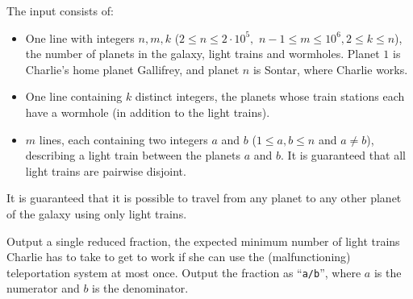 \begin{Input}
    The input consists of:
    \begin{itemize}
		\item One line with integers $n, m, k$ ($2 \leq n \leq 2\cdot10^5,$ $n - 1 \leq m \leq 10^6, 2\leq k\leq n$), the number of planets in the galaxy, light trains and
			wormholes.
			Planet $1$ is Charlie's home planet Gallifrey, and planet $n$ is Sontar, where Charlie works. 
		\item One line containing $k$ distinct integers, the planets whose
			train stations each have a wormhole (in addition to the light trains).
		\item $m$ lines, each containing two integers $a$ and $b$ ($1 \leq a,b
			\leq n$ and $a \neq b$), describing a light train between the planets $a$ and $b$.
			It is guaranteed that all light trains are pairwise disjoint.
    \end{itemize}
	It is guaranteed that it is possible to travel from any planet to any other planet of the galaxy using only light trains. 

\end{Input}

\begin{Output}
	Output a single reduced fraction, the expected minimum number of light trains Charlie has to take to get to work if she can use the (malfunctioning) teleportation system at most once.
	Output the fraction as ``\texttt{a/b}'', where $a$ is the numerator and $b$ is the denominator.
\end{Output}
